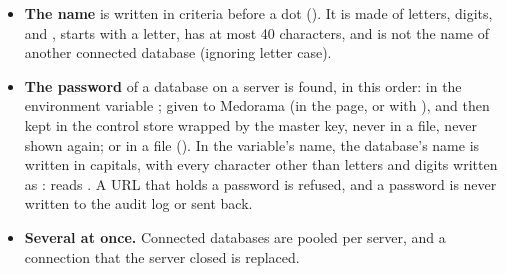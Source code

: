 \begin{itemize}
\item \textbf{The name} is written in criteria before a dot (). It is made of
  letters, digits, \code{-} and \code{\_}, starts with a letter, has at most 40 characters, and
  is not the name of another connected database (ignoring letter case).
\item \textbf{The password} of a database on a server is found, in this order: in the
  environment variable ; given to Medorama (in the page,
  or with ), and then kept in the control store wrapped by the master
  key, never in a file, never shown again; or in a file (). In the
  variable's name, the database's name is written in capitals, with every character other than
  letters and digits written as \code{\_}:  reads
  . A URL that holds a password is refused, and a
  password is never written to the audit log or sent back.
\item \textbf{Several at once.} Connected databases are pooled per server, and a connection that
  the server closed is replaced.
\end{itemize}

